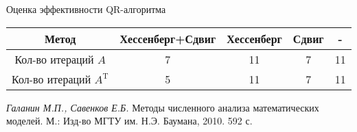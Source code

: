 \documentclass[12pt, a4paper]{article}
\begin{document}
	\centering 
	Оценка эффективности QR-алгоритма
	
	\begin{center}
		\begin{tabular}{|c|c|c|c|c|}
			\hline
			\textbf{Метод}        & \textbf{{Хессенберг+Сдвиг}}&\textbf{{Хессенберг}}&\textbf{{Сдвиг}}&\textbf{{-}} \\ \hline
			Кол-во итераций $A$ &7&11&7&11\\
			 \hline
			 Кол-во итераций $A^\text{T}$ &5&11&7&11\\
			 \hline
		\end{tabular}
	\end{center}


	\newpage
	\begin{thebibliography}{1}
		 \textit{Галанин М.П., Савенков Е.Б.} Методы численного анализа математических\\ моделей. М.: Изд-во МГТУ им. Н.Э. Баумана,	2010. 592 с.
		
	\end{thebibliography}
	
	
\end{document}
